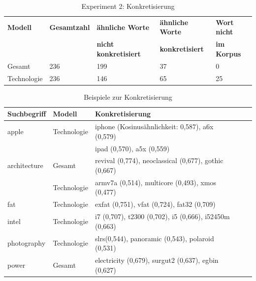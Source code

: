 \documentclass[12pt,a4paper]{report}
\begin{document}
\begin{table}[H]
\caption{Experiment 2: Konkretisierung}
\begin{center}
\begin{tabular}{|l||l|l|l|l|}
\hline
\textbf{Modell} & \textbf{Gesamtzahl}& \textbf{ähnliche Worte} & \textbf{ähnliche Worte}  & \textbf{Wort nicht}  \\
 & &\textbf{nicht konkretisiert} & \textbf{konkretisiert} & \textbf{im Korpus} \\

\hline
 Gesamt & 236 & 199 & 37 & 0 \\
 \hline
 Technologie & 236 & 146 & 65 & 25 \\
 \hline
 
\end{tabular}
\end{center}
\end{table}
		
		

\begin{table}[H]
\caption{Beispiele zur Konkretisierung}
\label{tab:BspKonkretisierung}
\begin{center}
\begin{tabular}{|l||l|l|l|l|}
\hline
\textbf{Suchbegriff} & \textbf{Modell} & \textbf{Konkretisierung}   \\

\hline
 apple & Technologie & iphone (Kosinusähnlichkeit: 0,587), a6x (0,579)\\
 & & ipad (0,570), a5x (0,559)\\
 \hline
 architecture	   & Gesamt & revival (0,774), neoclassical (0,677), gothic (0,667) \\
 & Technologie& armv7a (0,514), multicore (0,493), xmos (0,477) \\
\hline
 fat	& Technologie	& exfat (0,751), vfat (0,724), fat32 (0,709)	\\
 	\hline
 intel	 & Technologie& i7 (0,707), t2300 (0,702), i5 (0,666), i52450m (0,663) \\
 \hline
 photography	& Technologie& slrs(0,544), panoramic (0,543), polaroid (0,531)\\
 	\hline
 power	&	Gesamt &	electricity (0,679), surgut2 (0,637), egbin (0,627) \\
 	\hline
 
\end{tabular}
\end{center}
\end{table}
		
\end{document}
